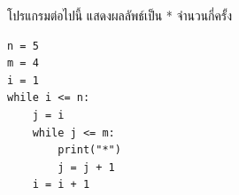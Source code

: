 \question โปรแกรมต่อไปนี้ แสดงผลลัพธ์เป็น * จำนวนกี่ครั้ง
\begin{verbatim}
n = 5
m = 4
i = 1
while i <= n:
    j = i
    while j <= m:
        print("*")
        j = j + 1
    i = i + 1
\end{verbatim}
